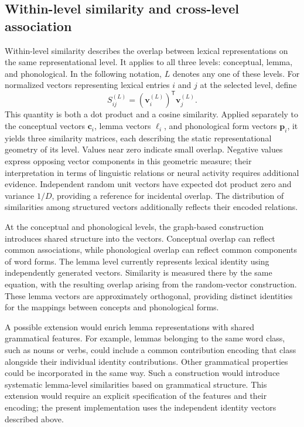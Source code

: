 \subsection{Within-level similarity and cross-level association}
Within-level similarity describes the overlap between lexical representations on the same representational level. It applies to all three levels: conceptual, lemma, and phonological. In the following notation, $L$ denotes any one of these levels. For normalized vectors representing lexical entries $i$ and $j$ at the selected level, define
\begin{equation}
 S^{(L)}_{ij}=(\mathbf v_i^{(L)})^{\mathsf T}\mathbf v_j^{(L)}.
 \label{eq:similarity}
\end{equation}
This quantity is both a dot product and a cosine similarity. Applied separately to the conceptual vectors $\mathbf c_i$, lemma vectors $\boldsymbol\ell_i$, and phonological form vectors $\mathbf p_i$, it yields three similarity matrices, each describing the static representational geometry of its level. Values near zero indicate small overlap. Negative values express opposing vector components in this geometric measure; their interpretation in terms of linguistic relations or neural activity requires additional evidence. Independent random unit vectors have expected dot product zero and variance $1/D$, providing a reference for incidental overlap. The distribution of similarities among structured vectors additionally reflects their encoded relations.

At the conceptual and phonological levels, the graph-based construction introduces shared structure into the vectors. Conceptual overlap can reflect common associations, while phonological overlap can reflect common components of word forms. The lemma level currently represents lexical identity using independently generated vectors. Similarity is measured there by the same equation, with the resulting overlap arising from the random-vector construction. These lemma vectors are approximately orthogonal, providing distinct identities for the mappings between concepts and phonological forms.

A possible extension would enrich lemma representations with shared grammatical features. For example, lemmas belonging to the same word class, such as nouns or verbs, could include a common contribution encoding that class alongside their individual identity contributions. Other grammatical properties could be incorporated in the same way. Such a construction would introduce systematic lemma-level similarities based on grammatical structure. This extension would require an explicit specification of the features and their encoding; the present implementation uses the independent identity vectors described above.

